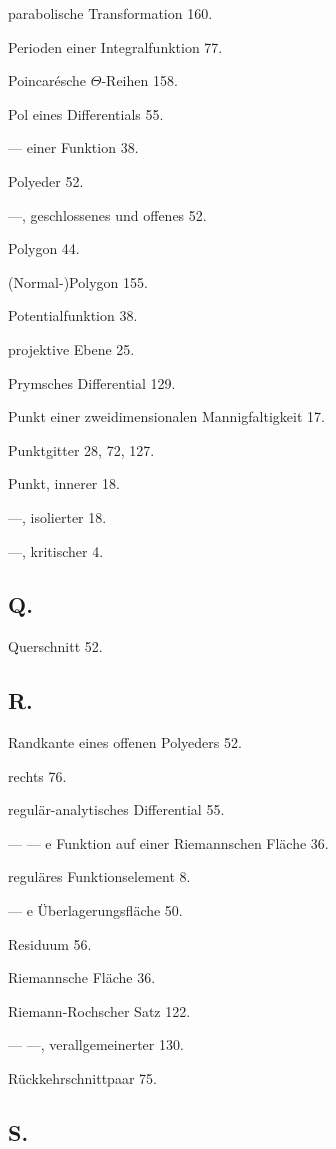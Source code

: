\documentclass{article}
\begin{document}
parabolische Transformation 160.

Perioden einer Integralfunktion 77.

Poincarésche $\Theta$-Reihen 158.

Pol eines Differentials 55.

--- einer Funktion 38.

Polyeder 52.

---, geschlossenes und offenes 52.

Polygon 44.

(Normal-)Polygon 155.

Potentialfunktion 38.

projektive Ebene 25.

Prymsches Differential 129.

Punkt einer zweidimensionalen Mannigfaltigkeit 17.

Punktgitter 28, 72, 127.

Punkt, innerer 18.

---, isolierter 18.

---, kritischer 4.

\subsection*{Q.}

Querschnitt 52.

\subsection*{R.}

Randkante eines offenen Polyeders 52.

rechts 76.

regulär-analytisches Differential 55.

--- --- e Funktion auf einer Riemannschen Fläche 36.

reguläres Funktionselement 8.

--- e Überlagerungsfläche 50.

Residuum 56.

Riemannsche Fläche 36.

Riemann-Rochscher Satz 122.

--- ---, verallgemeinerter 130.

Rückkehrschnittpaar 75.

\subsection*{S.}
\end{document}
